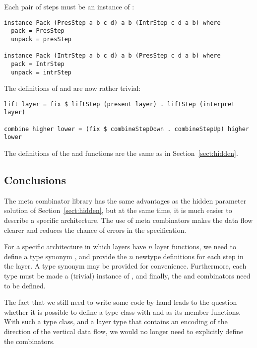 \documentclass[preprint,natbib]{sigplanconf}
\begin{document}
Each pair of steps must be an instance of : 

\begin{small}
\begin{verbatim}
instance Pack (PresStep a b c d) a b (IntrStep c d a b) where
  pack = PresStep
  unpack = presStep

instance Pack (IntrStep a b c d) a b (PresStep c d a b) where
  pack = IntrStep
  unpack = intrStep
\end{verbatim}
\end{small}

The definitions of  and  are now rather trivial:

\begin{small}
\begin{verbatim}
lift layer = fix $ liftStep (present layer) . liftStep (interpret layer)

combine higher lower = (fix $ combineStepDown . combineStepUp) higher lower
\end{verbatim}
\end{small}

The definitions of the  and  functions are the same as in Section~\ref{sect:hidden}.


\subsection{Conclusions} 

The meta combinator library has the same advantages as the hidden parameter solution of Section~\ref{sect:hidden}, but at the same time, it is much easier to describe a specific architecture. The use of meta combinators makes the data flow clearer and reduces the chance of errors in the specification.

For a specific architecture in which layers have $n$ layer functions, we need to define a type synonym , and provide the $n$ newtype definitions  for each step in the layer. A type synonym  may be provided for convenience. Furthermore, each type  must be made a (trivial) instance of , and finally, the  and  combinators need to be defined.

The fact that we still need to write some code by hand leads to the question whether it is possible to define a type class with   and  as its member functions. With such a type class, and a layer type that contains an encoding of the direction of the vertical data flow, we would no longer need to explicitly define the combinators.
\end{document}
